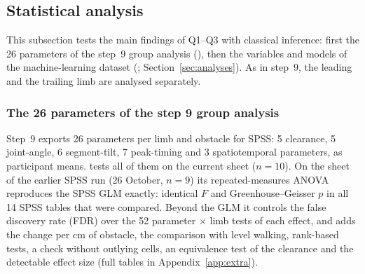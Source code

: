\subsection{Statistical analysis}
\label{sec:res-stats}

This subsection tests the main findings of Q1--Q3 with classical inference: first the 26 parameters of the step~9 group analysis
(), then the variables and models of the machine-learning dataset (;
Section~\ref{sec:analyses}). As in step~9, the leading and the trailing limb are analysed separately.

\subsubsection{The 26 parameters of the step 9 group analysis}
\label{sec:res-params}

Step~9 exports 26 parameters per limb and obstacle for SPSS: 5 clearance, 5 joint-angle, 6 segment-tilt, 7 peak-timing and 3
spatiotemporal parameters, as participant means.  tests all of them on the current sheet ($n = 10$). On the
sheet of the earlier SPSS run (26 October, $n = 9$) its repeated-measures ANOVA reproduces the SPSS GLM exactly: identical $F$ and
Greenhouse--Geisser $p$ in all 14 SPSS tables that were compared. Beyond the GLM it controls the false discovery rate (FDR) over the 52
parameter $\times$ limb tests of each effect, and adds the change per cm of obstacle, the comparison with level walking, rank-based
tests, a check without outlying cells, an equivalence test of the clearance and the detectable effect size (full tables in
Appendix~\ref{app:extra}).

